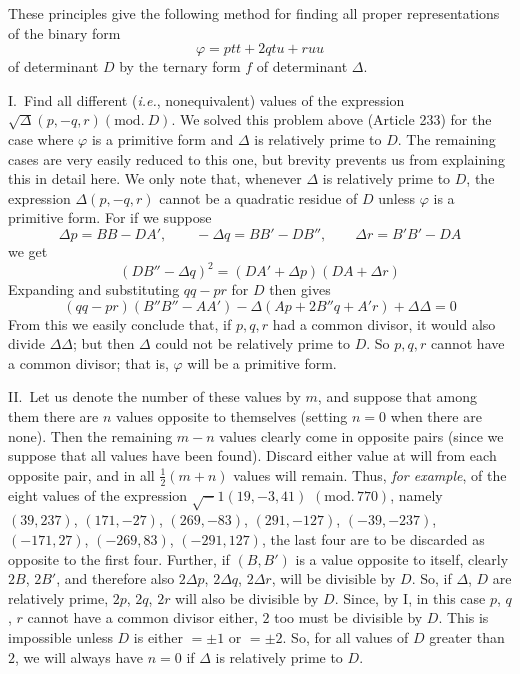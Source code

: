 These principles give the following method for finding all proper
representations of the binary form
\[
\varphi=ptt+2qtu+ruu
\]
of determinant $D$ by the ternary form $f$ of determinant $\Delta$.

I.\ Find all different (\textit{i.e.}, nonequivalent) values of the expression
$\surd\Delta(p,\allowbreak -q,\allowbreak r)(\mathrm{mod.}\ D)$. We solved this problem above (Article 233) for the case where $\varphi$
is a primitive form and $\Delta$ is relatively prime to $D$. The remaining
cases are very easily reduced to this one, but brevity prevents us from
explaining this in detail here. We only note that, whenever $\Delta$ is
relatively prime to $D$, the expression $\Delta(p,-q,r)$ cannot be a quadratic
residue of $D$ unless $\varphi$ is a primitive form. For if we suppose
\[
\Delta p=BB-DA',\qquad -\Delta q=BB'-DB'',\qquad \Delta r=B'B'-DA
\]
we get
\[
(DB''-\Delta q)^2=(DA'+\Delta p)(DA+\Delta r)
\]
Expanding and substituting $qq-pr$ for $D$ then gives
\[
(qq-pr)(B''B''-AA')-\Delta(Ap+2B''q+A'r)+\Delta\Delta=0
\]
From this we easily conclude that, if $p,q,r$ had a common divisor, it
would also divide $\Delta\Delta$; but then $\Delta$ could not be relatively prime
to $D$. So $p,q,r$ cannot have a common divisor; that is, $\varphi$ will be
a primitive form.

II.\ Let us denote the number of these values by $m$, and suppose
that among them there are $n$ values opposite to themselves (setting
$n=0$ when there are none). Then the remaining $m-n$ values clearly
come in opposite pairs (since we suppose that all values have been found).
Discard either value at will from each opposite pair, and in all $\frac{1}{2}(m+n)$
values will remain. Thus, \textit{for example}, of the eight values of the expression
$\surd-1(19,-3,41)$
$(\mathrm{mod.}\,770)$, namely $(39,237)$, $(171,-27)$, $(269,-83)$, $(291,-127)$, $(-39,-237)$, $(-171,27)$, $(-269,83)$,
$(-291,127)$, the last four are to be discarded as opposite to the first four.
Further, if $(B,B')$ is a value opposite to itself, clearly $2B$, $2B'$,
and therefore also $2\Delta p$, $2\Delta q$, $2\Delta r$, will be divisible by $D$.
So, if $\Delta$, $D$ are relatively prime, $2p$, $2q$, $2r$
will also be divisible by $D$. Since, by I, in this case $p$,
$q$, $r$ cannot have a common divisor either, $2$ too must
be divisible by $D$. This is impossible unless $D$ is either
$=\pm1$ or $=\pm2$. So, for all values of $D$ greater than $2$,
we will always have $n=0$ if $\Delta$ is relatively prime to $D$.

